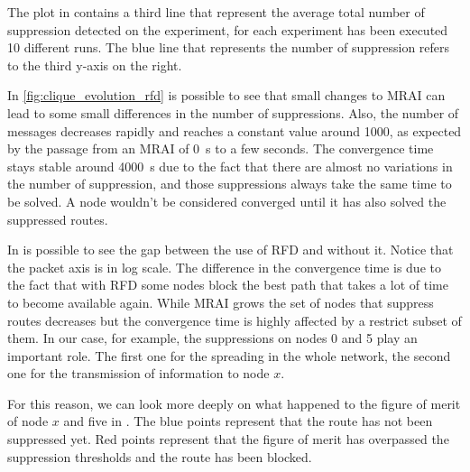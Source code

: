 The plot in  contains a third line that represent
the average total number of suppression detected on the experiment, for each experiment
has been executed \num{10} different runs.
The blue line that represents the number of suppression refers to the third y-axis
on the right.

In \cref{fig:clique_evolution_rfd} is possible to see that small changes to \ac{MRAI}
can lead to some small differences in the number of suppressions.
Also, the number of messages decreases rapidly and reaches a constant
value around \num{1000}, as expected by the passage from an \ac{MRAI} of \SI{0}{\second}
to a few seconds.
The convergence time stays stable around \SI{4000}{\second} due to the
fact that there are almost no variations in the number of suppression,
and those suppressions always take the same time to be solved.
A node wouldn't be considered converged until it has also solved the suppressed
routes.

In  is possible to see the
gap between the use of \ac{RFD} and without it.
Notice that the packet axis is in log scale.
The difference in the convergence time is due to the fact that with \ac{RFD} some
nodes block the best path that takes a lot of time to become available again.
While \ac{MRAI} grows the set of nodes that suppress routes decreases but the
convergence time is highly affected by a restrict subset of them.
In our case, for example, the suppressions on nodes \num{0} and \num{5} play
an important role.
The first one for the spreading in the whole network, the second one for the
transmission of information to node $x$.

For this reason, we can look more deeply on what happened to the figure of merit
of node $x$ and five in .
The blue points represent that the route has not been suppressed yet.
Red points represent that the figure of merit has overpassed the suppression
thresholds and the route has been blocked.

